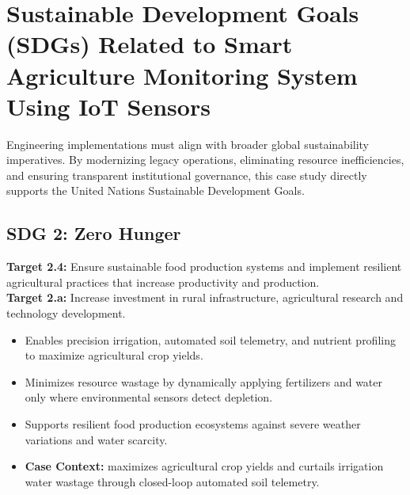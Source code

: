 \section{Sustainable Development Goals (SDGs) Related to Smart Agriculture Monitoring System Using IoT Sensors}
Engineering implementations must align with broader global sustainability imperatives. By modernizing legacy operations, eliminating resource inefficiencies, and ensuring transparent institutional governance, this case study directly supports the United Nations Sustainable Development Goals.

\subsection{SDG 2: Zero Hunger}
\noindent\textbf{Target 2.4:} Ensure sustainable food production systems and implement resilient agricultural practices that increase productivity and production. \\
\noindent\textbf{Target 2.a:} Increase investment in rural infrastructure, agricultural research and technology development.
\begin{itemize}
  \item Enables precision irrigation, automated soil telemetry, and nutrient profiling to maximize agricultural crop yields.
  \item Minimizes resource wastage by dynamically applying fertilizers and water only where environmental sensors detect depletion.
  \item Supports resilient food production ecosystems against severe weather variations and water scarcity.
  \item \textbf{Case Context:} maximizes agricultural crop yields and curtails irrigation water wastage through closed-loop automated soil telemetry.
\end{itemize}

